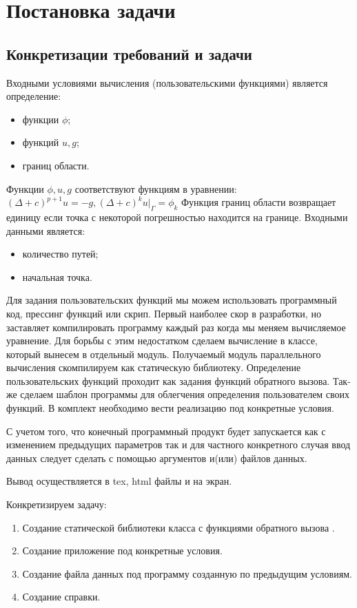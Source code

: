 \chapter{Постановка задачи}
\section{Конкретизации требований и задачи}
Входными условиями вычисления (пользовательскими функциями) является определение:
\begin{itemize}
	\item функции  $ \phi $;
	\item функций $ u,g $;
	\item границ области.
\end{itemize}
Функции $\phi,u,g $ соответствуют функциям в уравнении:
$ (\Delta +c)^{p+1}u=-g, (\Delta+c)^{k}u|_{\Gamma}=\phi_{k} $
Функция границ области возвращает единицу если точка с некоторой погрешностью находится на границе. 
Входными данными является:
\begin{itemize}
	\item количество путей;
	\item начальная точка.
\end{itemize}

Для задания пользовательских функций мы можем использовать программный код, прессинг функций или скрип. Первый наиболее скор в разработки, но заставляет компилировать программу каждый раз когда мы меняем вычисляемое уравнение. Для борьбы с этим недостатком сделаем вычисление в классе, который вынесем в отдельный модуль. Получаемый модуль параллельного вычисления скомпилируем как статическую библиотеку. Определение пользовательских функций проходит как задания функций обратного вызова. Так-же сделаем шаблон программы для облегчения определения пользователем своих функций. В комплект необходимо вести реализацию под конкретные условия. 

С учетом того, что конечный программный продукт будет запускается как с изменением предыдущих параметров так и для частного конкретного случая ввод данных следует сделать с помощью аргументов и(или) файлов данных.

Вывод осуществляется в tex, html файлы и на экран. 

Конкретизируем задачу: 
\begin{enumerate}
	\item Создание статической библиотеки класса с функциями обратного вызова .
	\item Создание приложение под конкретные условия.
	\item Создание файла данных под программу созданную по предыдущим условиям.
	\item Создание справки.
\end{enumerate}


